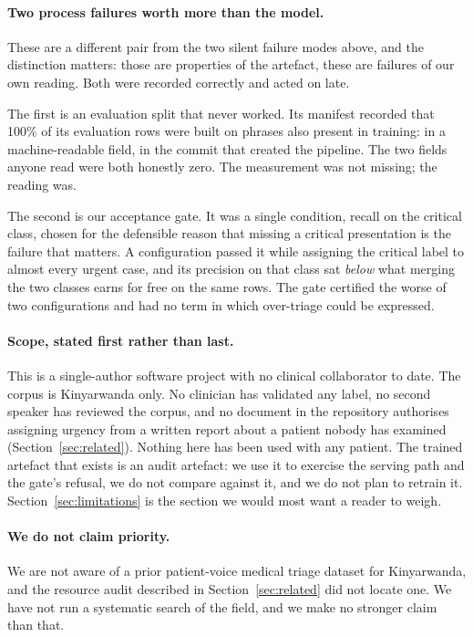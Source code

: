 \paragraph{Two process failures worth more than the model.} These are a
different pair from the two silent failure modes above, and the distinction
matters: those are properties of the artefact, these are failures of our own
reading. Both were recorded correctly and acted on late.

The first is an evaluation split that never worked. Its manifest recorded that
100\% of its evaluation rows were built on phrases also present in training:
in a machine-readable field, in the commit that created the pipeline. The two
fields anyone read were both honestly zero. The measurement was not missing; the
reading was.

The second is our acceptance gate. It was a single condition, recall on the
critical class, chosen for the defensible reason that missing a critical
presentation is the failure that matters. A configuration passed it while
assigning the critical label to almost every urgent case, and its precision on
that class sat \emph{below} what merging the two classes earns for free on the
same rows. The gate certified the worse of two configurations and had no term in
which over-triage could be expressed.

\paragraph{Scope, stated first rather than last.} This is a single-author
software project with no clinical collaborator to date. The corpus is Kinyarwanda
only. No clinician has validated any label, no second speaker has reviewed the
corpus, and no document in the repository authorises assigning urgency from a
written report about a patient nobody has examined
(Section~\ref{sec:related}). Nothing here has been used with any patient. The
trained artefact that exists is an audit artefact: we use it to exercise the
serving path and the gate's refusal, we do not compare against it, and we do not
plan to retrain it. Section~\ref{sec:limitations} is the section we would most
want a reader to weigh.

\paragraph{We do not claim priority.} We are not aware of a prior patient-voice
medical triage dataset for Kinyarwanda, and the resource audit described in
Section~\ref{sec:related} did not locate one. We have not run a systematic search
of the field, and we make no stronger claim than that.

